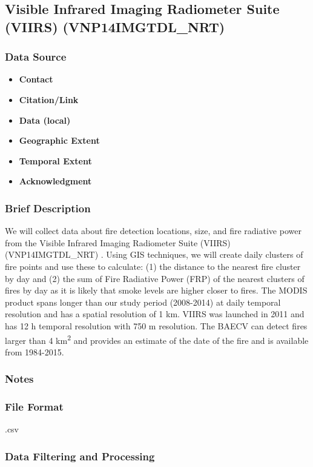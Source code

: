 \subsection{Visible Infrared Imaging Radiometer Suite (VIIRS) (VNP14IMGTDL\_NRT) }
\subsubsection*{Data Source}
\begin{itemize}[nolistsep]
\item \textbf{Contact}
\item \textbf{Citation/Link}
\item \textbf{Data (local)}
\item \textbf{Geographic Extent}
\item \textbf{Temporal Extent}
\item \textbf{Acknowledgment}
\end{itemize}
\subsubsection*{Brief Description}

We will collect data about fire detection locations, size, and fire radiative power from the Visible Infrared Imaging Radiometer Suite (VIIRS) (VNP14IMGTDL\_NRT) 
\citep{Schroeder2014}. %
Using GIS techniques, we will create daily clusters of fire points and use these to calculate: (1) the distance to the nearest fire cluster by day and (2) the sum of Fire Radiative Power (FRP) of the nearest clusters of fires by day as it is likely that smoke levels are higher closer to fires. The MODIS product spans longer than our study period (2008-2014) at daily temporal resolution and has a spatial resolution of 1 km. VIIRS was launched in 2011 and has 12 h temporal resolution with 750 m resolution. The BAECV can detect fires larger than 4 km\textsuperscript{2} and provides an estimate of the date of the fire and is available from 1984-2015. 

\subsubsection*{Notes}
\subsubsection*{File Format} .csv
\subsubsection*{Data Filtering and Processing}
